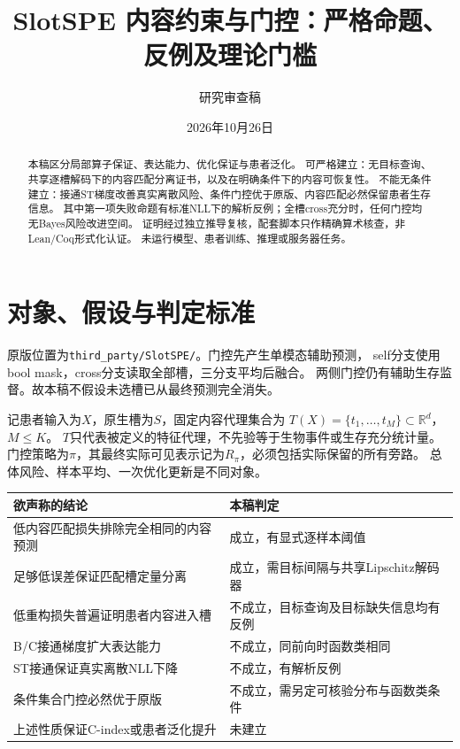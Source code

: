 \documentclass[UTF8,fontset=fandol,11pt,a4paper]{ctexart}
\title{SlotSPE 内容约束与门控：严格命题、反例及理论门槛}
\author{研究审查稿}
\date{2026年10月26日}
\theoremstyle{remark}
\newcommand{\R}{\mathbb R}
\begin{document}
\maketitle
\begin{abstract}
本稿区分局部算子保证、表达能力、优化保证与患者泛化。
可严格建立：无目标查询、共享逐槽解码下的内容匹配分离证书，以及在明确条件下的内容可恢复性。
不能无条件建立：接通ST梯度改善真实离散风险、条件门控优于原版、内容匹配必然保留患者生存信息。
其中第一项失败命题有标准NLL下的解析反例；全槽cross充分时，任何门控均无Bayes风险改进空间。
证明经过独立推导复核，配套脚本只作精确算术核查，非Lean/Coq形式化认证。
未运行模型、患者训练、推理或服务器任务。
\end{abstract}
\tableofcontents

\section{对象、假设与判定标准}
原版位置为\texttt{third\_party/SlotSPE/}。门控先产生单模态辅助预测，
self分支使用bool mask，cross分支读取全部槽，三分支平均后融合。
两侧门控仍有辅助生存监督。故本稿不假设未选槽已从最终预测完全消失。

记患者输入为$X$，原生槽为$S$，固定内容代理集合为
$T(X)=\{t_1,\ldots,t_M\}\subset\R^d$，$M\le K$。
$T$只代表被定义的特征代理，不先验等于生物事件或生存充分统计量。
门控策略为$\pi$，其最终实际可见表示记为$R_\pi$，必须包括实际保留的所有旁路。
总体风险、样本平均、一次优化更新是不同对象。

\begin{center}
\begin{tabular}{p{}p{}}
\toprule
欲声称的结论 & 本稿判定\\ \midrule
低内容匹配损失排除完全相同的内容预测 & 成立，有显式逐样本阈值\\
足够低误差保证匹配槽定量分离 & 成立，需目标间隔与共享Lipschitz解码器\\
低重构损失普遍证明患者内容进入槽 & 不成立，目标查询及目标缺失信息均有反例\\
B/C接通梯度扩大表达能力 & 不成立，同前向时函数类相同\\
ST接通保证真实离散NLL下降 & 不成立，有解析反例\\
条件集合门控必然优于原版 & 不成立，需另定可核验分布与函数类条件\\
上述性质保证C-index或患者泛化提升 & 未建立\\ \bottomrule
\end{tabular}
\end{center}
\end{document}
